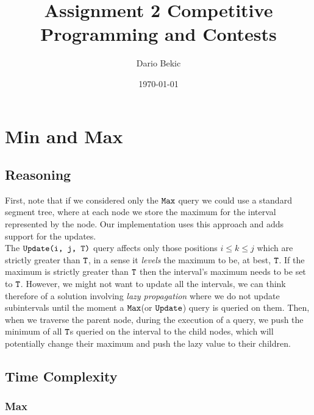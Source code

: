 \documentclass[a4paper,12pt]{article}
\title{Assignment 2 Competitive Programming and Contests}
\author{Dario Bekic}
\date{\today}
\begin{document}
\maketitle
\tableofcontents

\section{Min and Max}

\subsection{Reasoning}

First, note that if we considered only the $\verb|Max|$ query we could use a standard segment tree, where at each node we store the maximum for the interval represented by the node. Our implementation uses this approach and adds support for the updates. \\
The $\verb|Update(i, j, T)|$ query affects only those positions $i\le k \le j$ which are strictly greater than $\verb|T|$, in a sense it \textit{levels} the maximum to be, at best, $\verb|T|$. 
If the maximum is strictly greater than $\verb|T|$ then the interval's maximum needs to be set to $\verb|T|$.
However, we might not want to update all the intervals, we can think therefore of a solution involving \textit{lazy propagation} where we do not update subintervals until the moment a $\verb|Max|$(or $\verb|Update|$) query is queried on them. Then, when we traverse the parent node, during the execution of a query, we push the minimum of all $\verb|T|$s queried on the interval to the child nodes, which will potentially change their maximum and push the lazy value to their children.\\

\subsection{Time Complexity}

\subsubsection{Max}
\end{document}

